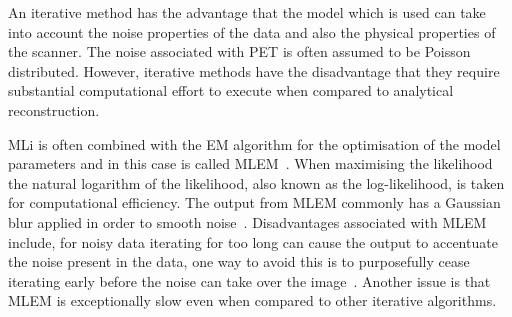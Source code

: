
            An iterative method has the advantage that the model which is used can take into account the noise properties of the data and also the physical properties of the scanner. The noise associated with \gls{PET} is often assumed to be Poisson distributed. However, iterative methods have the disadvantage that they require substantial computational effort to execute when compared to analytical reconstruction.
            
            \gls{MLi} is often combined with the \gls{EM} algorithm for the optimisation of the model parameters and in this case is called \gls{MLEM}~\parencite{MLEMBib, PETMLEMBib, PETMLEM2Bib}. When maximising the likelihood the natural logarithm of the likelihood, also known as the log-likelihood, is taken for computational efficiency. The output from \gls{MLEM} commonly has a Gaussian blur applied in order to smooth noise~\parencite{PETMLEMFiltBib}. Disadvantages associated with \gls{MLEM} include, for noisy data iterating for too long can cause the output to accentuate the noise present in the data, one way to avoid this is to purposefully cease iterating early before the noise can take over the image~\parencite{PETMLEMTerminationBib}. Another issue is that \gls{MLEM} is exceptionally slow even when compared to other iterative algorithms. %
            
